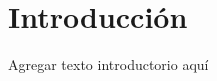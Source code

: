 \documentclass[11pt, twoside]{book}
\begin{document}
\chapter*{Introducción} 

Agregar texto introductorio aquí
\end{document}
